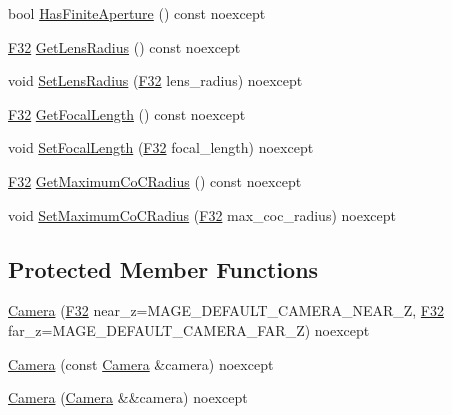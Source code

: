 \begin{DoxyCompactItemize}
\item 
bool \hyperlink{classmage_1_1_camera_a414cfe9e97f0e42364056e78412fef1a}{Has\+Finite\+Aperture} () const noexcept
\item 
\hyperlink{namespacemage_aa97e833b45f06d60a0a9c4fc22ae02c0}{F32} \hyperlink{classmage_1_1_camera_a7c3890887fc155ab275321b962744e80}{Get\+Lens\+Radius} () const noexcept
\item 
void \hyperlink{classmage_1_1_camera_af507ae56708b3591c174af01295e4071}{Set\+Lens\+Radius} (\hyperlink{namespacemage_aa97e833b45f06d60a0a9c4fc22ae02c0}{F32} lens\+\_\+radius) noexcept
\item 
\hyperlink{namespacemage_aa97e833b45f06d60a0a9c4fc22ae02c0}{F32} \hyperlink{classmage_1_1_camera_a473908b18eb0d9d011eb789c9138fffb}{Get\+Focal\+Length} () const noexcept
\item 
void \hyperlink{classmage_1_1_camera_a3c4e2c6a00c11ae0f0fd404d3d4f511b}{Set\+Focal\+Length} (\hyperlink{namespacemage_aa97e833b45f06d60a0a9c4fc22ae02c0}{F32} focal\+\_\+length) noexcept
\item 
\hyperlink{namespacemage_aa97e833b45f06d60a0a9c4fc22ae02c0}{F32} \hyperlink{classmage_1_1_camera_a92714d8092aa5230771b8f3452f6f969}{Get\+Maximum\+Co\+C\+Radius} () const noexcept
\item 
void \hyperlink{classmage_1_1_camera_a586912018439ff0cbd6ed2d6d9554db4}{Set\+Maximum\+Co\+C\+Radius} (\hyperlink{namespacemage_aa97e833b45f06d60a0a9c4fc22ae02c0}{F32} max\+\_\+coc\+\_\+radius) noexcept
\end{DoxyCompactItemize}
\subsection*{Protected Member Functions}
\begin{DoxyCompactItemize}
\item 
\hyperlink{classmage_1_1_camera_a796814605bd5a8f27b9be6538af00c32}{Camera} (\hyperlink{namespacemage_aa97e833b45f06d60a0a9c4fc22ae02c0}{F32} near\+\_\+z=M\+A\+G\+E\+\_\+\+D\+E\+F\+A\+U\+L\+T\+\_\+\+C\+A\+M\+E\+R\+A\+\_\+\+N\+E\+A\+R\+\_\+Z, \hyperlink{namespacemage_aa97e833b45f06d60a0a9c4fc22ae02c0}{F32} far\+\_\+z=M\+A\+G\+E\+\_\+\+D\+E\+F\+A\+U\+L\+T\+\_\+\+C\+A\+M\+E\+R\+A\+\_\+\+F\+A\+R\+\_\+Z) noexcept
\item 
\hyperlink{classmage_1_1_camera_a13f576c2ea50712145e43501bf3cae9c}{Camera} (const \hyperlink{classmage_1_1_camera}{Camera} \&camera) noexcept
\item 
\hyperlink{classmage_1_1_camera_a858d43c7b166ef580c7d971719045371}{Camera} (\hyperlink{classmage_1_1_camera}{Camera} \&\&camera) noexcept
\end{DoxyCompactItemize}
